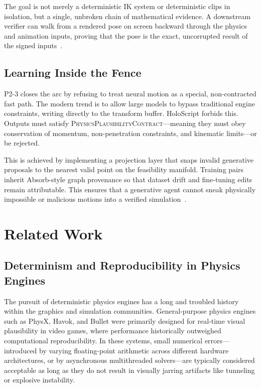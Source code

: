 \documentclass[sigconf,nonacm]{acmart}
\newcommand{\plausibility}{\textsc{PhysicsPlausibilityContract}}
\begin{document}
The goal is not merely a deterministic IK system or deterministic clips in isolation, but a single, unbroken chain of mathematical evidence. A downstream verifier can walk from a rendered pose on screen backward through the physics and animation inputs, proving that the pose is the exact, uncorrupted result of the signed inputs~\cite{paper-8-unified-siggraph2027}.

\subsection{Learning Inside the Fence}
P2-3 closes the arc by refusing to treat neural motion as a special, non-contracted fast path. The modern trend is to allow large models to bypass traditional engine constraints, writing directly to the transform buffer. HoloScript forbids this. Outputs must satisfy \plausibility{}---meaning they must obey conservation of momentum, non-penetration constraints, and kinematic limits---or be rejected. 

This is achieved by implementing a projection layer that snaps invalid generative proposals to the nearest valid point on the feasibility manifold. Training pairs inherit Absorb-style graph provenance so that dataset drift and fine-tuning edits remain attributable. This ensures that a generative agent cannot sneak physically impossible or malicious motions into a verified simulation~\cite{paper-9-motion-asia2027}.
\section{Related Work}

\subsection{Determinism and Reproducibility in Physics Engines} The pursuit of
deterministic physics engines has a long and troubled history within the
graphics and simulation communities. General-purpose physics engines such as
PhysX, Havok, and Bullet were primarily designed for real-time visual
plausibility in video games, where performance historically outweighed
computational reproducibility. In these systems, small numerical errors---
introduced by varying floating-point arithmetic across different hardware
architectures, or by asynchronous multithreaded solvers---are typically
considered acceptable as long as they do not result in visually jarring
artifacts like tunneling or explosive instability.
\end{document}
